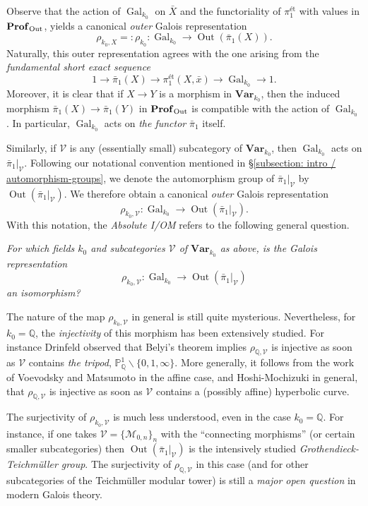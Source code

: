 \documentclass[11pt]{amsart}
\theoremstyle{definition}
\theoremstyle{remark}
\numberwithin{equation}{section}
\DeclareMathOperator{\Gal}{Gal}
\DeclareMathOperator{\Out}{Out}
\newcommand{\Q}{\mathbb{Q}}
\newcommand{\Pbb}{\mathbb{P}}
\newcommand{\Vc}{\mathcal{V}}
\newcommand{\Profinite}{{\mathbf{Prof}_{\rm Out}}}
\newcommand{\Var}{\mathbf{Var}}
\newcommand{\Galk}{{\Gal_{k_0}}}
\begin{document}
Observe that the action of $\Galk$ on $\bar X$ and the functoriality of $\pi_1^\text{\'et}$ with values in $\Profinite$, yields a canonical \emph{outer} Galois representation
\[ \rho_{k_0,X} =: \rho_{k_0} : \Galk \rightarrow \Out(\bar\pi_1(X)). \]
Naturally, this outer representation agrees with the one arising from the \emph{fundamental short exact sequence}
\[ 1 \rightarrow \bar\pi_1(X) \rightarrow \pi_1^\text{\'et}(X,\bar x) \rightarrow \Galk \rightarrow 1. \]
Moreover, it is clear that if $X \rightarrow Y$ is a morphism in $\Var_{k_0}$, then the induced morphism $\bar\pi_1(X) \rightarrow \bar\pi_1(Y)$ in $\Profinite$ is compatible with the action of $\Galk$.
In particular, $\Galk$ acts on \emph{the functor} $\bar\pi_1$ itself.

Similarly, if $\Vc$ is any (essentially small) subcategory of $\Var_{k_0}$, then $\Galk$ acts on $\bar\pi_1|_\Vc$.
Following our notational convention mentioned in \S\ref{subsection: intro / automorphism-groups}, we denote the automorphism group of $\bar\pi_1|_\Vc$ by $\Out(\bar\pi_1|_\Vc)$.
We therefore obtain a canonical \emph{outer} Galois representation
\[ \rho_{k_0,\Vc} : \Galk \rightarrow \Out(\bar\pi_1|_\Vc). \]
With this notation, the \emph{Absolute I/OM} refers to the following general question.

\vskip 5pt
{\em For which fields $k_0$ and subcategories $\Vc$ of $\Var_{k_0}$ as above, is the Galois representation 
\[ \rho_{k_0,\Vc} : \Galk \rightarrow \Out(\bar\pi_1|_\Vc) \]
an isomorphism?}
\vskip 5pt

The nature of the map $\rho_{k_0,\Vc}$ in general is still quite mysterious.
Nevertheless, for $k_0 = \Q$, the \emph{injectivity} of this morphism has been extensively studied.
For instance {\sc Drinfeld} \cite{Drinfeld:1990} observed that Belyi's theorem \cite{Belyi:1980} implies $\rho_{\Q,\Vc}$ is injective as soon as $\Vc$ contains \emph{the tripod}, $\Pbb^1_\Q \smallsetminus \{0,1,\infty\}$.
More generally, it follows from the work of {\sc Voevodsky} \cite{Voevodsky:1991} and {\sc Matsumoto} \cite{Matsumoto:1996} in the affine case, and {\sc Hoshi-Mochizuki} \cite{Hoshi:2011} in general, that $\rho_{\Q,\Vc}$ is injective as soon as $\Vc$ contains a (possibly affine) hyperbolic curve.

The surjectivity of $\rho_{k_0,\Vc}$ is much less understood, even in the case $k_0 = \Q$.
For instance, if one takes $\Vc = \{\mathcal{M}_{0,n}\}_n$ with the ``connecting morphisms'' (or certain smaller subcategories) then $\Out(\bar\pi_1|_\Vc)$ is the intensively studied \emph{Grothendieck-Teichm\"uller group}.
The surjectivity of $\rho_{\Q,\Vc}$ in this case (and for other subcategories of the Teichm\"uller modular tower) is still a \emph{major open question} in modern Galois theory.
\end{document}
